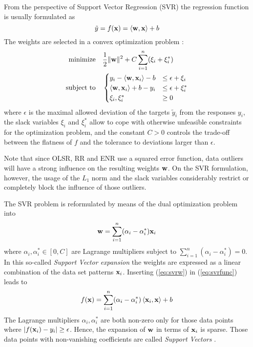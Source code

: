 From the perspective of Support Vector Regression (SVR) the regression
function is usually formulated as 
\begin{equation}
\label{eq:svrfunc}
  \tilde{y} = f(\mathbf{x}) = \left\langle\mathbf{w},\mathbf{x}\right\rangle + b
\end{equation}
The weights are selected in a convex optimization problem
\citep{Smola2004}:
\begin{align*}
  \text{minimize} \quad  & \frac{1}{2}\|\mathbf{w}\|^2 + C\sum_{i=1}^n(\xi_i+\xi_i^\ast) \\
  \text{subject to} \quad & 
  \begin{cases}
    y_i - \left\langle\mathbf{w},\mathbf{x}_i\right\rangle - b &\leq \epsilon + \xi_i    \\
    \left\langle\mathbf{w},\mathbf{x}_i\right\rangle + b -y_i  &\leq \epsilon + \xi_i^\ast\\
    \xi_i,\xi_i^\ast               &\geq 0
  \end{cases}
\end{align*}
where $\epsilon$ is the maximal allowed deviation of the targets
$\tilde{y}_i$ from the responses $y_i$, the slack variables $\xi_i$
and $\xi_i^\ast$ allow to cope with otherwise unfeasible constraints
for the optimization problem, and the constant $C>0$ controls the
trade-off between the flatness of $f$ and the tolerance to deviations
larger than $\epsilon$.

Note that since OLSR, RR and ENR use a squared error function, data
outliers will have a strong influence on the resulting weights
$\mathbf{w}$.  On the SVR formulation, however, the usage of the $L_1$
norm and the slack variables considerably restrict or completely block
the influence of those outliers.

The SVR problem is reformulated by means of the dual optimization
problem into \citep{Smola2004}
\begin{equation}
  \label{eq:svrw}
  \mathbf{w}=\sum_{i=1}^n(\alpha_i-\alpha_i^\ast)\mathbf{x}_i
\end{equation}
where $\alpha_i,\alpha_i^\ast\in[0,C]$ are Lagrange multipliers
subject to $\sum_{i=1}^n(\alpha_i-\alpha_i^\ast)=0$.
%
In this so-called \emph{Support Vector expansion} the weights are
expressed as a linear combination of the data set patterns
$\mathbf{x}_i$.
%
Inserting (\ref{eq:svrw}) in (\ref{eq:svrfunc}) leads to
\begin{equation}
  \label{eq:svrf}
 f(\mathbf{x}) = \sum_{i=1}^n(\alpha_i-\alpha_i^\ast)\left\langle\mathbf{x}_i,\mathbf{x}\right\rangle + b
\end{equation}
The Lagrange multipliers $\alpha_i,\alpha_i^\ast$ are both non-zero
only for those data points where $|f(\mathbf{x}_i) - y_i|\geq\epsilon$.
Hence, the expansion of $\mathbf{w}$ in terms of $\mathbf{x}_i$ is sparse.
Those data points with non-vanishing coefficients are called
\emph{Support Vectors} \citep{Wei2013}.

